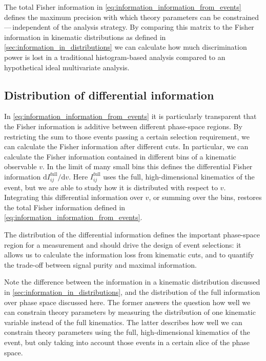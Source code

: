 The total Fisher information in
\autoref{eq:information_information_from_events} defines the maximum
precision with which theory parameters can be
constrained\,---\,independent of the analysis strategy. By comparing
this matrix to the Fisher information in kinematic distributions as
defined in \ref{sec:information_in_distributions} we can calculate how
much discrimination power is lost in a traditional histogram-based
analysis compared to an hypothetical ideal multivariate analysis.



\subsection{Distribution of differential information}
\label{sec:information_differential}

In \autoref{eq:information_information_from_events} it is particularly
transparent that the Fisher information is additive between different
phase-space regions.  By restricting the sum to those events passing a
certain selection requirement, we can calculate the Fisher information
after different cuts. In particular, we can calculate the Fisher
information contained in different bins of a kinematic observable
$v$. In the limit of many small bins this defines the differential
Fisher information $\mathrm{d} I_{ij}^{\text{full}} / \mathrm{d} v$.
Here $I_{ij}^{\text{full}}$ uses the full, high-dimensional kinematics
of the event, but we are able to study how it is distributed with
respect to $v$. Integrating this differential information over $v$, or
summing over the bins, restores the total Fisher information defined
in \autoref{eq:information_information_from_events}.

The distribution of the differential information defines the important
phase-space region for a measurement and should drive the design of
event selections: it allows us to calculate the information loss from
kinematic cuts, and to quantify the trade-off between signal purity
and maximal information.

Note the difference between the information in a kinematic
distribution discussed in \autoref{sec:information_in_distributions},
and the distribution of the full information over phase space
discussed here. The former answers the question how well we can
constrain theory parameters by measuring the distribution of one
kinematic variable instead of the full kinematics. The latter
describes how well we can constrain theory parameters using the full,
high-dimensional kinematics of the event, but only taking into account
those events in a certain slice of the phase space.



